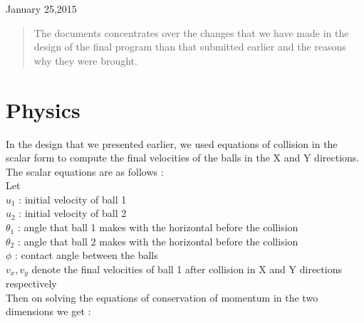 \begin{titlepage}

\vspace{60mm}

{\large January 25,2015}\\[2cm] %

%
 


\vfill %

\end{titlepage}


\begin{abstract}
The documents concentrates over the changes that we have made in the design of the final program than that submitted earlier and the reasons why they were brought. 
\end{abstract}

\section{Physics}

In the design that we presented earlier, we used equations of collision in the scalar form to compute the final velocities of the balls in the X and Y directions. The scalar equations are as follows :
\\
Let 
\\$u_1$ : initial velocity of ball 1
\\$u_2$ : initial velocity of ball 2
\\$\theta_1$ : angle that ball 1 makes with the horizontal before the collision
\\$\theta_2$ : angle that ball 2 makes with the horizontal before the collision
\\$\phi$ : contact angle between the balls
\\
$v_x, v_y $ denote the final velocities of ball 1 after collision in X and Y directions respectively
\\
Then on solving the equations of conservation of momentum in the two dimensions we get : 

